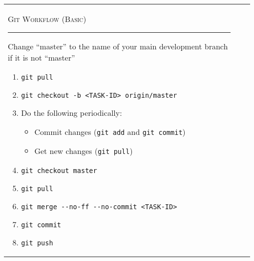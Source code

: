 \documentclass[landscape]{article}
\begin{document}
\begin{tabular*}{10.5in}{|p{2.9in}|p{2.9in}|p{2.9in}|}
    \begin{flushleft}
        \textsc{Git Workflow (Basic)}
        \rule{2.9in}{.5pt}
        \normalsize{Change ``master'' to the name of your main development
        branch if it is not ``master''}
        \small
        \begin{enumerate}
            \item{\verb!git pull!}
            \item{\verb!git checkout -b <TASK-ID> origin/master!}
            \item{Do the following periodically:}
                \begin{itemize}
                    \item{Commit changes (\verb!git add! and \verb!git commit!)}
                    \item{Get new changes (\verb!git pull!)}
                \end{itemize}
            \item{\verb!git checkout master!}
            \item{\verb!git pull!}
            \item{\verb!git merge --no-ff --no-commit <TASK-ID>!}
            \item{\verb!git commit!}
            \item{\verb!git push!}
        \end{enumerate}


\end{flushleft}
\end{tabular*}
\end{document}
